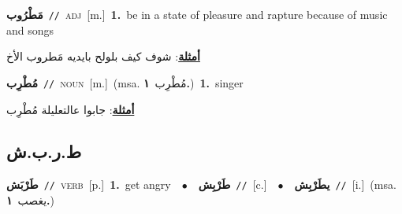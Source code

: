 \documentclass[10pt,a4paper,twoside]{article} %
\begin{document}
\begin{multicols}{2}
{\setlength\topsep{0pt}\textbf{\foreignlanguage{arabic}{مَطْرُوب}}\ {\color{gray}\texttt{//}\color{black}}\ \textsc{adj}\ [m.]\ \textbf{1.}~be in a state of pleasure and rapture because of music and songs\  \begin{flushright}\color{gray}\foreignlanguage{arabic}{\textbf{\underline{\foreignlanguage{arabic}{أمثلة}}}: شوف كيف بلولح بايديه  مَطروب الأخ}\end{flushright}\color{black}} \vspace{2mm}

{\setlength\topsep{0pt}\textbf{\foreignlanguage{arabic}{مُطْرِب}}\ {\color{gray}\texttt{//}\color{black}}\ \textsc{noun}\ [m.]\ \color{gray}(msa. \foreignlanguage{arabic}{مُطْرِب}~\foreignlanguage{arabic}{\textbf{١.}})\color{black}\ \textbf{1.}~singer\  \begin{flushright}\color{gray}\foreignlanguage{arabic}{\textbf{\underline{\foreignlanguage{arabic}{أمثلة}}}: جابوا عالتعليلة مُطْرِب}\end{flushright}\color{black}} \vspace{2mm}

\vspace{-3mm}
\subsection*{\color{blue}\foreignlanguage{arabic}{ط.ر.ب.ش}\color{blue}{}} 

{\setlength\topsep{0pt}\textbf{\foreignlanguage{arabic}{طَرْبَش}}\ {\color{gray}\texttt{//}\color{black}}\ \textsc{verb}\ [p.]\ \textbf{1.}~get angry\ \ $\bullet$\ \ \setlength\topsep{0pt}\textbf{\foreignlanguage{arabic}{طَرْبِش}}\ {\color{gray}\texttt{//}\color{black}}\ [c.]\ \ $\bullet$\ \ \setlength\topsep{0pt}\textbf{\foreignlanguage{arabic}{يطَرْبِش}}\ {\color{gray}\texttt{//}\color{black}}\ [i.]\ \color{gray}(msa. \foreignlanguage{arabic}{يغصب}~\foreignlanguage{arabic}{\textbf{١.}})\color{black}\ } \vspace{2mm}


\end{multicols}
\end{document}
